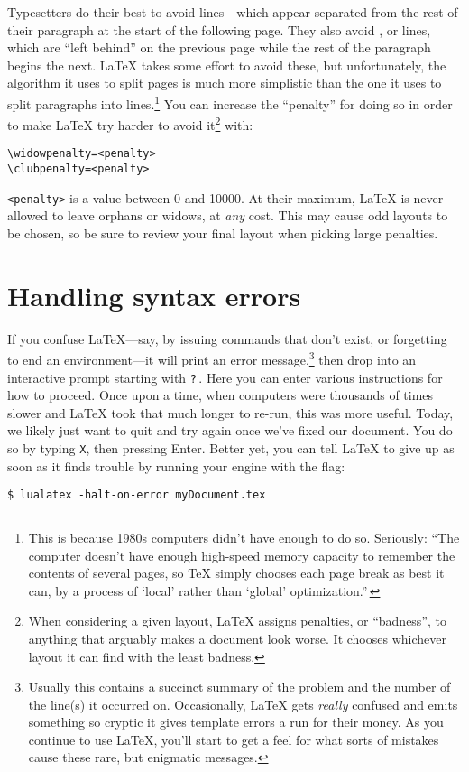 Typesetters do their best to avoid  lines---which appear
separated from the rest of their paragraph at the start of the following
page.
They also avoid , or  lines,
which are ``left behind'' on the previous page while the rest of the paragraph
begins the next.
\LaTeX{} takes some effort to avoid these, but unfortunately, the algorithm it
uses to split pages is much more simplistic than the one it uses
to split paragraphs into lines.\punckern\footnote{This is because
1980s computers didn't have enough  to do so. Seriously:
``The computer doesn't have enough high-speed memory capacity to remember the
contents of several pages,
so \TeX{} simply chooses each page break as best it can, by a process of
`local' rather than `global' optimization.\quotekern''\,}
You can increase the ``penalty'' for doing so in order to make \LaTeX{}
try harder to avoid it\footnote{When considering a given layout,
\LaTeX{} assigns penalties, or ``badness''\quotekern,
to anything that arguably makes a document look worse.
It chooses whichever layout it can find with the least badness.}
with:
\begin{leftfigure}
\begin{lstlisting}
\widowpenalty=<penalty>
\clubpenalty=<penalty>
\end{lstlisting}
\end{leftfigure}
\verb|<penalty>| is a value between 0 and 10000.
At their maximum, \LaTeX{} is never allowed to leave orphans or widows,
at \emph{any} cost.
This may cause odd layouts to be chosen,
so be sure to review your final layout when picking large penalties.

\section{Handling syntax errors}
If you confuse \LaTeX{}---say, by issuing commands that don't exist,
or forgetting to end an environment---it will print an
error message,\punckern\footnote{Usually this contains a succinct summary of
the problem and the number of the line(s) it occurred on. Occasionally,
\LaTeX{} gets \emph{really} confused and emits something so cryptic it gives
\cpp{} template errors a run for their money.
As you continue to use \LaTeX, you'll start to get a feel for what sorts of
mistakes cause these rare, but enigmatic messages.}
then drop into an interactive prompt starting with \texttt{?}\,.
Here you can enter various instructions for how to proceed.
Once upon a time, when computers were thousands of times slower and
\LaTeX{} took that much longer to re-run, this was more useful.
Today, we likely just want to quit and try again once we've fixed our document.
You do so by typing \texttt{X}, then pressing Enter.
Better yet, you can tell \LaTeX{} to give up as soon as it finds trouble
by running your engine with the  flag:
\begin{leftfigure}
\begin{lstlisting}
$ lualatex -halt-on-error myDocument.tex
\end{lstlisting}
\end{leftfigure}
